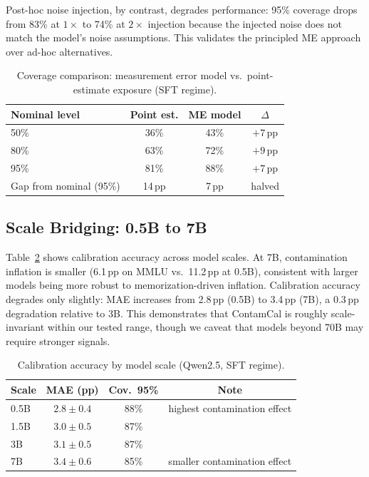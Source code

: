 \documentclass[letterpaper]{article}
\begin{document}
Post-hoc noise injection, by contrast, degrades performance: 95\% coverage drops from 83\% at $1\times$ to 74\% at $2\times$ injection because the injected noise does not match the model's noise assumptions.
This validates the principled ME approach over ad-hoc alternatives.

\begin{table}[t]
\centering
\caption{Coverage comparison: measurement error model vs.\ point-estimate exposure (SFT regime).}
\label{tab:me_ablation}
\begin{tabular}{lccc}
\toprule
\textbf{Nominal level} & \textbf{Point est.} & \textbf{ME model} & $\Delta$ \\
\midrule
50\% & 36\% & 43\% & $+7$\,pp \\
80\% & 63\% & 72\% & $+9$\,pp \\
95\% & 81\% & 88\% & $+7$\,pp \\
\midrule
Gap from nominal (95\%) & 14\,pp & 7\,pp & halved \\
\bottomrule
\end{tabular}
\end{table}

\subsection{Scale Bridging: 0.5B to 7B}
\label{sec:scale}

Table~\ref{tab:scale} shows calibration accuracy across model scales.
At 7B, contamination inflation is smaller (6.1\,pp on MMLU vs.\ 11.2\,pp at 0.5B), consistent with larger models being more robust to memorization-driven inflation.
Calibration accuracy degrades only slightly: MAE increases from 2.8\,pp (0.5B) to 3.4\,pp (7B), a 0.3\,pp degradation relative to 3B.
This demonstrates that ContamCal is roughly scale-invariant within our tested range, though we caveat that models beyond 70B may require stronger signals.

\begin{table}[t]
\centering
\caption{Calibration accuracy by model scale (Qwen2.5, SFT regime).}
\label{tab:scale}
\begin{tabular}{lccc}
\toprule
\textbf{Scale} & \textbf{MAE (pp)} & \textbf{Cov.\ 95\%} & \textbf{Note} \\
\midrule
0.5B & $2.8{\pm}0.4$ & 88\% & highest contamination effect \\
1.5B & $3.0{\pm}0.5$ & 87\% & \\
3B & $3.1{\pm}0.5$ & 87\% & \\
7B & $3.4{\pm}0.6$ & 85\% & smaller contamination effect \\
\bottomrule
\end{tabular}
\end{table}
\end{document}
